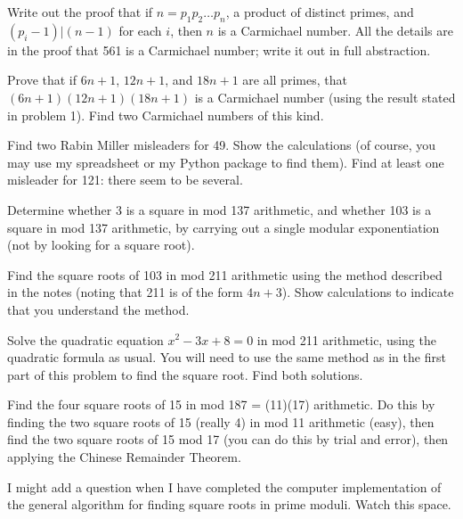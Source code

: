 \documentclass[12pt]{article}
\begin{document}
\begin{description}

\item  Write out the proof that if $n=p_1p_2\ldots p_n$, a product of distinct primes, and $(p_i-1)|(n-1)$ for each $i$, then
$n$ is a Carmichael number.  All the details are in the proof that 561 is a Carmichael number;  write it out in full abstraction.

\item  Prove that if $6n+1$, $12n+1$, and $18n+1$ are all primes, that $(6n+1)(12n+1)(18n+1)$ is a Carmichael number (using the result stated in problem 1).  Find two Carmichael numbers of this kind.

\item  Find two Rabin Miller misleaders for 49.  Show the calculations (of course, you may use my spreadsheet or my Python package to find them).  Find at least one misleader for 121:  there seem to be several.

\item  Determine whether 3 is a square in mod 137 arithmetic, and whether 103 is a square in mod 137 arithmetic, by carrying out a single modular exponentiation (not by looking for a square root).

\item  Find the square roots of 103 in mod 211 arithmetic using the method described in the notes (noting that 211 is of the form $4n+3$).  Show calculations to indicate that you understand the method.

Solve the quadratic equation $x^2-3x+8=0$ in mod 211 arithmetic, using the quadratic formula as usual.  You will need to use the same method as in the first part of this problem to find the square root.  Find both solutions.

\item  Find the four square roots of 15 in mod 187 = (11)(17) arithmetic.  Do this by  finding the two square roots of 15 (really 4) in mod 11 arithmetic (easy), then find the two square roots of 15 mod 17 (you can do this by trial and error), then applying the Chinese Remainder Theorem.



\item  I might add a question when I have completed the computer implementation of the general algorithm for finding square roots in prime moduli.  Watch this space.



\end{description}
\end{document}
